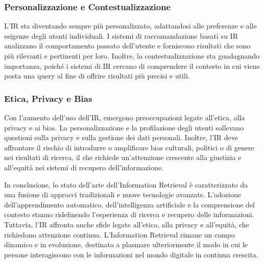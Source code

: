 \subsubsection{Personalizzazione e Contestualizzazione}
L'IR sta diventando sempre più personalizzato, adattandosi alle preferenze e alle esigenze degli utenti individuali. I sistemi di raccomandazione basati su IR analizzano il comportamento passato dell'utente e forniscono risultati che sono più rilevanti e pertinenti per loro. Inoltre, la contestualizzazione sta guadagnando importanza, poiché i sistemi di IR cercano di comprendere il contesto in cui viene posta una query al fine di offrire risultati più precisi e utili.

\subsubsection{Etica, Privacy e Bias}
Con l'aumento dell'uso dell'IR, emergono preoccupazioni legate all'etica, alla privacy e ai bias. La personalizzazione e la profilazione degli utenti sollevano questioni sulla privacy e sulla gestione dei dati personali. Inoltre, l'IR deve affrontare il rischio di introdurre o amplificare bias culturali, politici o di genere nei risultati di ricerca, il che richiede un'attenzione crescente alla giustizia e all'equità nei sistemi di recupero dell'informazione.

In conclusione, lo stato dell'arte dell'Information Retrieval è caratterizzato da una fusione di approcci tradizionali e nuove tecnologie avanzate. L'adozione dell'apprendimento automatico, dell'intelligenza artificiale e la comprensione del contesto stanno ridefinendo l'esperienza di ricerca e recupero delle informazioni. Tuttavia, l'IR affronta anche sfide legate all'etica, alla privacy e all'equità, che richiedono attenzione continua. L'Information Retrieval rimane un campo dinamico e in evoluzione, destinato a plasmare ulteriormente il modo in cui le persone interagiscono con le informazioni nel mondo digitale in continua crescita.